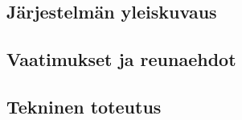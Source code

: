 
\subsection{Järjestelmän yleiskuvaus}

\subsection{Vaatimukset ja reunaehdot}

\subsection{Tekninen toteutus}
